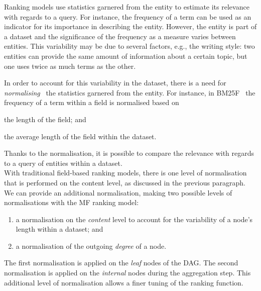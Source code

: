 Ranking models use statistics garnered from the entity to estimate its relevance with regards to a query. For instance, the frequency of a term can be used as an indicator for its importance in describing the entity. However, the entity is part of a dataset and the significance of the frequency as a measure varies between entities. This variability may be due to several factors, e.g., the writing style: two entities can provide the same amount of information about a certain topic, but one uses twice as much terms as the other.

In order to account for this variability in the dataset, there is a need for \emph{normalising}~\cite{manning:2008:iir} the statistics garnered from the entity. For instance, in BM25F~\cite{zaragoza:2004:microsoft} the frequency of a term within a field is normalised based on
\begin{inparaenum}[(a)]
	\item the length of the field; and
	\item the average length of the field within the dataset.
\end{inparaenum}
Thanks to the normalisation, it is possible to compare the relevance with regards to a query of entities within a dataset.\\

With traditional field-based ranking models, there is one level of normalisation that is performed on the content level, as discussed in the previous paragraph.
We can provide an additional normalisation, making two possible levels of normalisations with the \gls{MF} ranking model:
\begin{enumerate}
	\item a normalisation on the \emph{content} level to account for the variability of a node's length within a dataset; and
	\label{norm:content}
	\item a normalisation of the outgoing \emph{degree} of a node.
	\label{norm:degree}
\end{enumerate}
The first normalisation is applied on the \emph{leaf} nodes of the DAG. The second normalisation is applied on the \emph{internal} nodes during the aggregation step. This additional level of normalisation allows a finer tuning of the ranking function.

